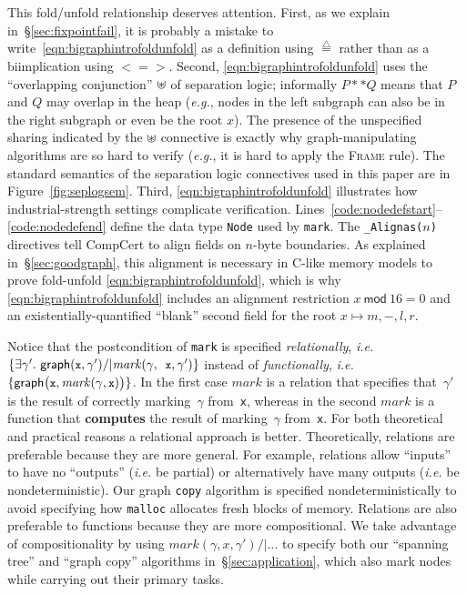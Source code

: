 \documentclass[acmsmall,screen]{acmart}
\newcommand{\li}[1]{{\texttt{\small #1}}}
\newcommand{\scon}{\mathbin{\star}}
\renewcommand{\scon}{\mathbin{\ast}} \renewcommand{\bigstar}{\raisebox{-0.24em}{{\scaleobj{2.5}{\scon}}}}
\newcommand{\ocon}{
  \mathbin{\mbox{$\mathrlap{\cup}\hspace*{.09em}
      \raisebox{.04em}[0ex][0ex]{$\scon$}$\hspace*{.07em}}}}
\newcommand{\defeq}{\mathbin{\stackrel{\triangle}{=}}}
\newcommand{\p}[1]{\ensuremath{\mathsf{#1}}} \newcommand{\m}[1]{\ensuremath{\mathit{#1}}} \newcommand{\ma}[1]{\ensuremath{\mathcal{#1}}} \let\ramify\lightning
\newcommand{\infrulestyle}[1]{\textsc{#1}}
\begin{document}
{This fold/unfold relationship deserves attention.
First, as we explain in~\S\ref{sec:fixpointfail}, it is probably a mistake to write~\eqref{eqn:bigraphintrofoldunfold} as a definition using $\defeq$ rather than as a biimplication using $<=>$.  Second, \eqref{eqn:bigraphintrofoldunfold} uses the ``overlapping conjunction'' $\ocon$ of separation logic; informally $P ** Q$ means that $P$ and $Q$ may overlap in the heap (\emph{e.g.}, nodes in the left subgraph can also be in the right subgraph or even be the root $x$).  The presence of the unspecified sharing indicated by the $\ocon$ connective is exactly why graph-manipulating algorithms are so hard to verify (\emph{e.g.}, it is hard to apply the \infrulestyle{Frame} rule).  The standard semantics of the separation logic connectives used in this paper are in Figure~\ref{fig:seplogsem}.
Third, \eqref{eqn:bigraphintrofoldunfold} illustrates how industrial-strength settings complicate verification.  Lines~\mbox{\ref{code:nodedefstart}--\ref{code:nodedefend}} define the data type \li{Node} used by \li{mark}.  The \li{\_Alignas(}$n$\li{)} directives tell CompCert to align fields on $n$-byte boundaries.  As explained in~\S\ref{sec:goodgraph}, this alignment is necessary in C-like memory models to prove fold-unfold \eqref{eqn:bigraphintrofoldunfold}, which is why \eqref{eqn:bigraphintrofoldunfold} includes an alignment restriction $x~\mathsf{mod}~16 = 0$ and an existentially-quantified ``blank'' second field for the root $x \mapsto m,-,l,r$.


Notice that the postcondition of \li{mark} is specified \emph{relationally}, \emph{i.e.} $\{\exists \gamma'.~ \p{graph}(\li{x},\gamma') /| \m{mark}(\gamma, \li{x}, \gamma')\}$ instead of \emph{functionally}, \emph{i.e.} $\{\p{graph}\big(\li{x},\m{mark}(\gamma, \li{x})\big)\}$. In the first case $\m{mark}$ is a relation that specifies that~$\gamma'$ is the result of correctly marking~$\gamma$ from~\li{x}, whereas in the second $\m{mark}$ is a function that \textbf{computes} the result of marking~$\gamma$ from~\li{x}. For both theoretical and practical reasons a relational approach is better.
Theoretically, relations are preferable because they are more general.  For example, relations allow ``inputs'' to have no ``outputs'' (\emph{i.e.} be partial) or alternatively have many outputs (\emph{i.e.} be nondeterministic).  Our graph \li{copy} algorithm is specified nondeterministically to avoid specifying how \li{malloc} allocates fresh blocks of memory.  Relations are also preferable to functions because they are more compositional.
We take advantage of compositionality by using $\m{mark}(\gamma,x,\gamma') /| \ldots$ to specify both our ``spanning tree'' and ``graph copy'' algorithms in~\S\ref{sec:application}, which also mark nodes while carrying out their primary tasks.

}
\end{document}
